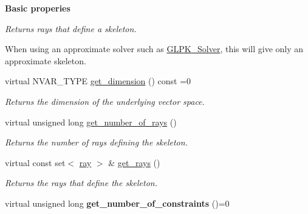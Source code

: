 \begin{Indent}\textbf{ Basic properies}\par
{\em Returns rays that define a skeleton.

When using an approximate solver such as \hyperlink{group___c_l_s_solvers_class_g_l_p_k___solver}{G\+L\+P\+K\+\_\+\+Solver}, this will give only an approximate skeleton. }\begin{DoxyCompactItemize}
\item 
\mbox{\label{group___c_l_s_solvers_ae85c7e9a24774fd3c08a7dd9a7b8a27c}} 
virtual N\+V\+A\+R\+\_\+\+T\+Y\+PE \hyperlink{group___c_l_s_solvers_ae85c7e9a24774fd3c08a7dd9a7b8a27c}{get\+\_\+dimension} () const =0
\begin{DoxyCompactList}\small\item\em Returns the dimension of the underlying vector space. \end{DoxyCompactList}\item 
\mbox{\label{group___c_l_s_solvers_a4262d944695d0cfcddf9e24908f72e8f}} 
virtual unsigned long \hyperlink{group___c_l_s_solvers_a4262d944695d0cfcddf9e24908f72e8f}{get\+\_\+number\+\_\+of\+\_\+rays} ()
\begin{DoxyCompactList}\small\item\em Returns the number of rays defining the skeleton. \end{DoxyCompactList}\item 
\mbox{\label{group___c_l_s_solvers_a06363bbbc8dfdb4c161a001d24f94afd}} 
virtual const set$<$ \hyperlink{group___c_l_s_solvers_classray}{ray} $>$ \& \hyperlink{group___c_l_s_solvers_a06363bbbc8dfdb4c161a001d24f94afd}{get\+\_\+rays} ()
\begin{DoxyCompactList}\small\item\em Returns the rays that define the skeleton. \end{DoxyCompactList}\item 
\mbox{\label{group___c_l_s_solvers_a0b587fd39cbefe969e4b3dbf34387b08}} 
virtual unsigned long {\bfseries get\+\_\+number\+\_\+of\+\_\+constraints} ()=0
\end{DoxyCompactItemize}
\end{Indent}
